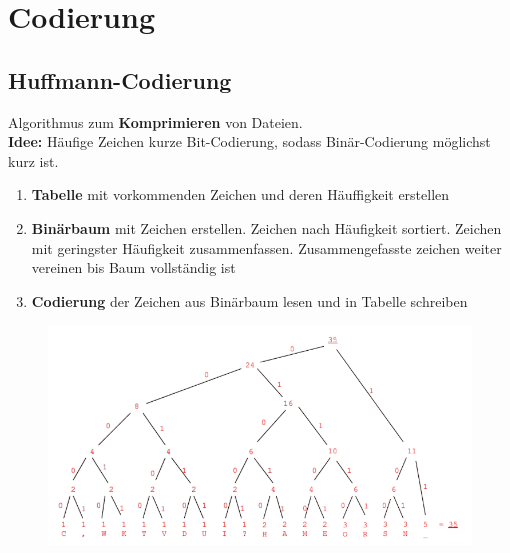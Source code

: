\documentclass[12pt,a4paper]{article}
\begin{document}
	\section{Codierung}
		\subsection{Huffmann-Codierung}
			Algorithmus zum \textbf{Komprimieren} von Dateien.\\
			\textbf{Idee:} Häufige Zeichen kurze Bit-Codierung, sodass Binär-Codierung möglichst kurz ist.
			\begin{enumerate}
				\item \textbf{Tabelle} mit vorkommenden Zeichen und deren Häuffigkeit erstellen
				\item \textbf{Binärbaum} mit Zeichen erstellen. Zeichen nach Häufigkeit sortiert. Zeichen mit geringster Häufigkeit zusammenfassen. Zusammengefasste zeichen weiter vereinen bis Baum vollständig ist
				\item \textbf{Codierung} der Zeichen aus Binärbaum lesen und in Tabelle schreiben
			\end{enumerate}
			\begin{center}
				\begin{figure}[!h]
					\includegraphics[width=\textwidth]{Bilder/Huffmann-Baum.png}
				\end{figure}
			\end{center}
\end{document}
